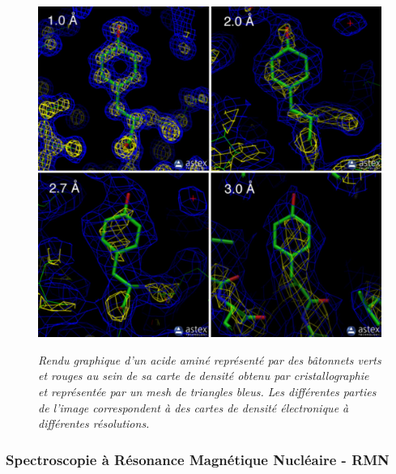 \begin{figure}[H]
  \centering
  {\includegraphics[width=0.7\linewidth]{./figures/ch1/resolution_xray.pdf}}
    \caption{\it Rendu graphique d'un acide aminé représenté par des bâtonnets verts et rouges au sein de sa carte de densité obtenu par cristallographie et représentée par un mesh de triangles bleus. Les différentes parties de l'image correspondent à des cartes de densité électronique à différentes résolutions.}
    \label{Fig:resolution_xray}
  \hspace{0.3cm}
\end{figure}

\subsubsection{Spectroscopie à Résonance Magnétique Nucléaire - RMN}

